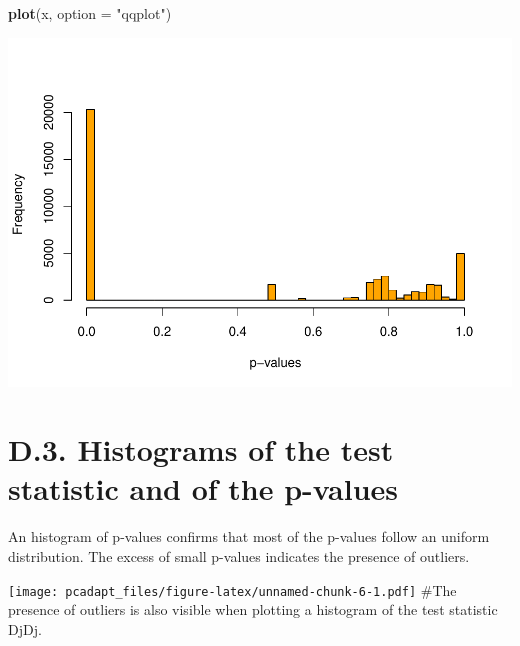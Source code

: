 \documentclass[]{article}
\newenvironment{Shaded}{\begin{snugshade}}{\end{snugshade}}
\newcommand{\KeywordTok}[1]{\textcolor[rgb]{0.13,0.29,0.53}{\textbf{#1}}}
\newcommand{\DataTypeTok}[1]{\textcolor[rgb]{0.13,0.29,0.53}{#1}}
\newcommand{\DecValTok}[1]{\textcolor[rgb]{0.00,0.00,0.81}{#1}}
\newcommand{\StringTok}[1]{\textcolor[rgb]{0.31,0.60,0.02}{#1}}
\newcommand{\OtherTok}[1]{\textcolor[rgb]{0.56,0.35,0.01}{#1}}
\newcommand{\OperatorTok}[1]{\textcolor[rgb]{0.81,0.36,0.00}{\textbf{#1}}}
\newcommand{\NormalTok}[1]{#1}
\begin{document}
\begin{Shaded}
\begin{Highlighting}[]
\KeywordTok{plot}\NormalTok{(x, }\DataTypeTok{option =} \StringTok{"qqplot"}\NormalTok{)}
\end{Highlighting}
\end{Shaded}

\includegraphics{pcadapt_files/figure-latex/unnamed-chunk-5-1.pdf}

\section{D.3. Histograms of the test statistic and of the
p-values}\label{d.3.-histograms-of-the-test-statistic-and-of-the-p-values}

An histogram of p-values confirms that most of the p-values follow an
uniform distribution. The excess of small p-values indicates the
presence of outliers.

\begin{Shaded}
\end{Shaded}

\texttt{[image: pcadapt\_files/figure-latex/unnamed-chunk-6-1.pdf]} \#The
presence of outliers is also visible when plotting a histogram of the
test statistic DjDj.
\end{document}
